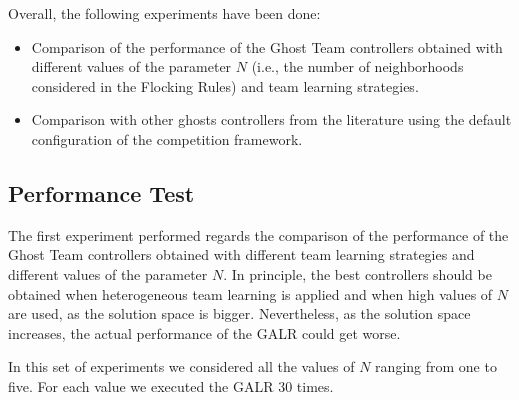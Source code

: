 \documentclass[journal]{IEEEtran}
\begin{document}
Overall, the following experiments have been done:

\begin{itemize}
  \item Comparison of the performance of the Ghost Team controllers obtained with different values of the parameter $N$ (i.e., the number of neighborhoods considered in the Flocking Rules) and team learning strategies.
  \item Comparison with other ghosts controllers from the literature using the default configuration of the competition framework.
\end{itemize}

\subsection{Performance Test}
The first experiment performed regards the comparison of the performance of the Ghost Team controllers obtained with different team learning strategies and different values of the parameter $N$. In principle, the best controllers should be obtained when heterogeneous team learning is applied and when high values of $N$ are used, as the solution space is bigger. Nevertheless, as the solution space increases, the actual performance of the GALR could get worse.

In this set of experiments we considered all the values of $N$ ranging from one to five. For each value we executed the GALR 30 times.
\end{document}
